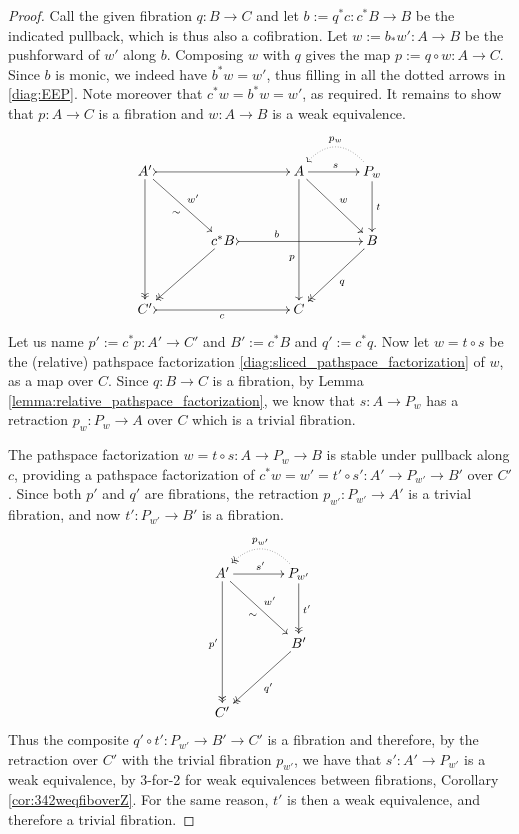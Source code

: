 \documentclass[11pt,reqno]{amsart}
\newcommand{\ra}{\ensuremath{\rightarrow}}
\theoremstyle{remark}
\theoremstyle{definition}
\begin{document}
\begin{proof}
Call the given fibration $q:B\ra C$ and let $b:=  q^*c : c^*B \ra B$ be the indicated pullback, which is thus also a cofibration. Let $w := b_*w' : A\ra B$ be the pushforward of $w'$ along $b$.  Composing $w$ with $q$ gives the map $p:= q\circ w:A\ra C$.  Since $b$ is monic, we indeed have $b^*w = w'$, thus filling in all the dotted arrows in \eqref{diag:EEP}.  Note moreover that $c^*w =  b^*w = w'$, as required. It remains to show that $p:A\ra C$ is a fibration and $w : A\ra B$ is a weak equivalence.   
\begin{equation}\label{diag:EEPfactored}
\xymatrix@=1.5em{
A' \ar@{->>}[dddd] \ar[rrdd]_{\sim}^{w'} \ar@{>->}[rrrr] && 
	&& A \ar[dddd]_>>>>>>>>>>>p \ar[rrdd]^{w} \ar[rr]^s 
	&& \ar@{.>}@/_1.5pc/[ll]_{p_w} P_w \ar[dd]^t \\
\\
&& c^*B \ar@{->>}[lldd] \ar@{>->}[rrrr]^<<<<<<<<<<b  &&&& B \ar@{->>}[lldd]^q  \\
\\
C' \ar@{>->}[rrrr]_c &&&& C &&
}
\end{equation}
Let us name $p':= c^*p : A' \ra C'$ and $B' := c^*B$ and $q':= c^*q$.
Now let $w=t\circ s$ be the (relative) pathspace factorization \eqref{diag:sliced_pathspace_factorization} of $w$, as a map over $C$.  Since $q:B \ra C$ is a fibration, by Lemma \ref{lemma:relative_pathspace_factorization}, we know that $s : A\ra P_w$ has a retraction $p_w : P_w \ra A$ over $C$ which is a trivial fibration.  

The pathspace factorization $w=t\circ s : A \ra P_w \ra B$ is stable under pullback along $c$, providing a pathspace factorization of $c^*w = w'=t'\circ s' : A' \ra P_{w'} \ra B'$ over $C'$.  Since both $p'$ and $q'$ are fibrations, the retraction $p_{w'}: P_{w'} \ra A'$ is a trivial fibration, and now $t' : P_{w'} \ra B'$ is a fibration.
\begin{equation}\label{diag:EEPfactored2}
\xymatrix@=1.5em{
A' \ar@{->>}[dddd]_{p'} \ar[rrdd]_{\sim}^{w'}  \ar[rr]^{s'} && \ar@{.>>}@/_1.5pc/[ll]_{p_{w'}} P_{w'} 
	\ar@{->>}[dd]^{t'} \\
\\
&& B' \ar@{->>}[lldd]^{q'} \\
\\
C' &&
}
\end{equation}
Thus the composite $q'\circ t' : P_{w'} \ra B' \ra C'$ is a fibration and therefore, by the retraction over $C'$ with the trivial fibration $p_{w'}$, we have that $s' : A' \ra P_{w'}$ is a weak equivalence, by 3-for-2 for weak equivalences between fibrations, Corollary \ref{cor:342weqfiboverZ}.  For the same reason, $t'$ is then a weak equivalence, and therefore a trivial fibration.


\end{proof}
\end{document}
